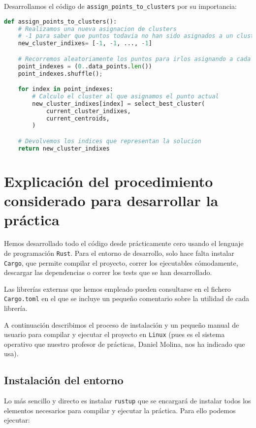 \documentclass[11pt]{article}
\begin{document}
Desarrollamos el código de \lstinline{assign_points_to_clusters} por su importancia:

\begin{lstlisting}[language=Python, style=Boxed]
def assign_points_to_clusters():
    # Realizamos una nueva asignacion de clusters
    # -1 para saber que puntos todavia no han sido asignados a un cluster
    new_cluster_indixes= [-1, -1, ..., -1]

    # Recorremos aleatoriamente los puntos para irlos asignando a cada cluster
    point_indexes = (0..data_points.len())
    point_indexes.shuffle();

    for index in point_indexes:
        # Calculo el cluster al que asignamos el punto actual
        new_cluster_indixes[index] = select_best_cluster(
            current_cluster_indixes,
            current_centroids,
        )

    # Devolvemos los indices que representan la solucion
    return new_cluster_indixes
\end{lstlisting}

\pagebreak

\section{Explicación del procedimiento considerado para desarrollar la práctica}

Hemos desarrollado todo el código desde prácticamente cero usando el lenguaje de programación \lstinline{Rust}. Para el entorno de desarrollo, solo hace falta instalar \lstinline{Cargo}, que permite compilar el proyecto, correr los ejecutables cómodamente, descargar las dependencias o correr los tests que se han desarrollado.

Las librerías externas que hemos empleado pueden consultarse en el fichero \lstinline{Cargo.toml} en el que se incluye un pequeño comentario sobre la utilidad de cada librería.

A continuación describimos el proceso de instalación y un pequeño manual de usuario para compilar y ejecutar el proyecto en \lstinline{Linux} (pues es el sistema operativo que nuestro profesor de prácticas, Daniel Molina, nos ha indicado que usa).

\subsection{Instalación del entorno}

Lo más sencillo y directo es instalar \lstinline{rustup} \footnotemark que se encargará de instalar todos los elementos necesarios para compilar y ejecutar la práctica. Para ello podemos ejecutar:
\end{document}
